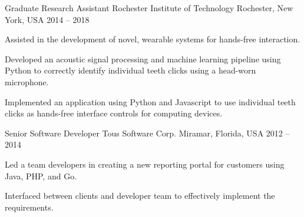 \begin{cventries}
  \cventry
    {Graduate Research Assistant}
    {Rochester Institute of Technology}
    {Rochester, New York, USA}
    {2014 -- 2018}
    {
      \begin{cvitems}
        \item Assisted in the development of novel, wearable systems for
          hands-free interaction.
        \item Developed an acoustic signal processing and machine learning
          pipeline using Python to correctly identify individual teeth clicks
          using a head-worn microphone.
        \item Implemented an application using Python and Javascript to use
          individual teeth clicks as hands-free interface controls for
          computing devices.
      \end{cvitems}
    }

  \cventry
    {Senior Software Developer}
    {Tous Software Corp.}
    {Miramar, Florida, USA}
    {2012 -- 2014}
    {
      \begin{cvitems}
        \item Led a team developers in creating a new reporting portal for
          customers using Java, PHP, and Go.
        \item Interfaced between clients and developer team to effectively
          implement the requirements.
      \end{cvitems}
    }

\end{cventries}
